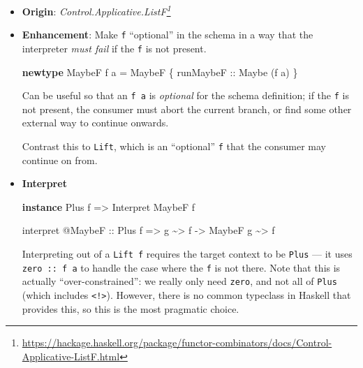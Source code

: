 \documentclass[]{article}
\newenvironment{Shaded}{}{}
\newcommand{\DataTypeTok}[1]{\textcolor[rgb]{0.56,0.13,0.00}{#1}}
\newcommand{\KeywordTok}[1]{\textcolor[rgb]{0.00,0.44,0.13}{\textbf{#1}}}
\newcommand{\NormalTok}[1]{#1}
\newcommand{\OperatorTok}[1]{\textcolor[rgb]{0.40,0.40,0.40}{#1}}
\newcommand{\OtherTok}[1]{\textcolor[rgb]{0.00,0.44,0.13}{#1}}
\renewcommand{\href}[2]{#2\footnote{\url{#1}}}
\begin{document}
\begin{itemize}
\item
  \textbf{Origin}:
  \emph{\href{https://hackage.haskell.org/package/functor-combinators/docs/Control-Applicative-ListF.html}{Control.Applicative.ListF}}
\item
  \textbf{Enhancement}: Make \texttt{f} ``optional'' in the schema in a way that
  the interpreter \emph{must fail} if the \texttt{f} is not present.

\begin{Shaded}
\begin{Highlighting}[]
\KeywordTok{newtype} \DataTypeTok{MaybeF}\NormalTok{ f a }\OtherTok{=} \DataTypeTok{MaybeF}\NormalTok{ \{}\OtherTok{ runMaybeF ::} \DataTypeTok{Maybe}\NormalTok{ (f a) \}}
\end{Highlighting}
\end{Shaded}

  Can be useful so that an \texttt{f\ a} is \emph{optional} for the schema
  definition; if the \texttt{f} is not present, the consumer must abort the
  current branch, or find some other external way to continue onwards.

  Contrast this to \texttt{Lift}, which is an ``optional'' \texttt{f} that the
  consumer may continue on from.
\item
  \textbf{Interpret}

\begin{Shaded}
\begin{Highlighting}[]
\KeywordTok{instance} \DataTypeTok{Plus}\NormalTok{ f }\OtherTok{=>} \DataTypeTok{Interpret} \DataTypeTok{MaybeF}\NormalTok{ f}

\NormalTok{interpret }\OperatorTok{@}\DataTypeTok{MaybeF}
\OtherTok{    ::} \DataTypeTok{Plus}\NormalTok{ f}
    \OtherTok{=>}\NormalTok{ g }\OperatorTok{\textasciitilde{}>}\NormalTok{ f}
    \OtherTok{{-}>} \DataTypeTok{MaybeF}\NormalTok{ g }\OperatorTok{\textasciitilde{}>}\NormalTok{ f}
\end{Highlighting}
\end{Shaded}

  Interpreting out of a \texttt{Lift\ f} requires the target context to be
  \texttt{Plus} --- it uses \texttt{zero\ ::\ f\ a} to handle the case where the
  \texttt{f} is not there. Note that this is actually ``over-constrained'': we
  really only need \texttt{zero}, and not all of \texttt{Plus} (which includes
  \texttt{\textless{}!\textgreater{}}). However, there is no common typeclass in
  Haskell that provides this, so this is the most pragmatic choice.
\end{itemize}
\end{document}
